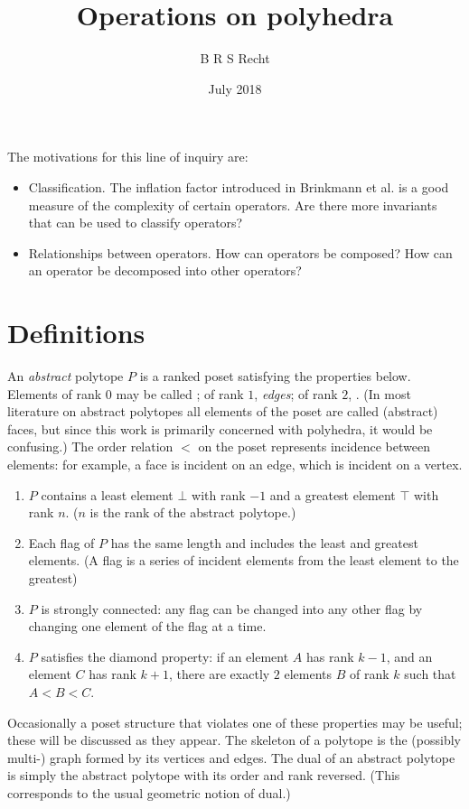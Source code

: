 \documentclass{amsart}[12pt]
\title{Operations on polyhedra}
\author{B R S Recht}
\date{July 2018}
\begin{document}
\maketitle

The motivations for this line of inquiry are:
\begin{itemize}
  \item Classification. The inflation factor introduced in Brinkmann et
  al. \cite{brinkmann} is a good measure of the complexity of certain operators.
  Are there more invariants that can be used to classify operators?
  \item Relationships between operators. How can operators be composed? How can
  an operator be decomposed into other operators?
\end{itemize}

\section{Definitions}

An \textit{abstract} polytope $P$ is a ranked poset satisfying the properties
below. Elements of rank $0$ may be called ; of rank $1$,
\textit{edges}; of rank $2$, . (In most literature on abstract
polytopes all elements of the poset are called (abstract) faces, but since this
work is primarily concerned with polyhedra, it would be confusing.) The order
relation $<$ on the poset represents incidence between elements: for example,
a face is incident on an edge, which is incident on a vertex.\cite{mcmullen}
\begin{enumerate}
  \item $P$ contains a least element $\bot$ with rank $-1$ and a greatest
  element $\top$ with rank $n$. ($n$ is the rank of the abstract polytope.)
  \item Each flag of $P$ has the same length and includes the least and greatest
  elements. (A flag is a series of incident elements from the least element to
  the greatest)
  \item $P$ is strongly connected: any flag can be changed into any other flag
  by changing one element of the flag at a time.
  \item $P$ satisfies the diamond property: if an element $A$ has rank $k-1$,
  and an element $C$ has rank $k+1$, there are exactly $2$ elements $B$ of
  rank $k$ such that $A < B < C$.
\end{enumerate}
Occasionally a poset structure that violates one of these properties may be
useful; these will be discussed as they appear. The skeleton of a polytope is
the (possibly multi-) graph formed by its vertices and edges.
The dual of an abstract polytope is simply the abstract polytope with its order
and rank reversed. (This corresponds to the usual geometric notion of dual.)
\end{document}
